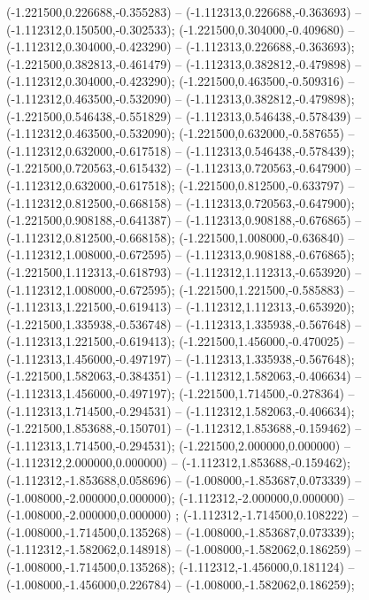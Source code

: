  (-1.221500,0.226688,-0.355283) -- (-1.112313,0.226688,-0.363693) -- (-1.112312,0.150500,-0.302533);
 (-1.221500,0.304000,-0.409680) -- (-1.112312,0.304000,-0.423290) -- (-1.112313,0.226688,-0.363693);
 (-1.221500,0.382813,-0.461479) -- (-1.112313,0.382812,-0.479898) -- (-1.112312,0.304000,-0.423290);
 (-1.221500,0.463500,-0.509316) -- (-1.112312,0.463500,-0.532090) -- (-1.112313,0.382812,-0.479898);
 (-1.221500,0.546438,-0.551829) -- (-1.112313,0.546438,-0.578439) -- (-1.112312,0.463500,-0.532090);
 (-1.221500,0.632000,-0.587655) -- (-1.112312,0.632000,-0.617518) -- (-1.112313,0.546438,-0.578439);
 (-1.221500,0.720563,-0.615432) -- (-1.112313,0.720563,-0.647900) -- (-1.112312,0.632000,-0.617518);
 (-1.221500,0.812500,-0.633797) -- (-1.112312,0.812500,-0.668158) -- (-1.112313,0.720563,-0.647900);
 (-1.221500,0.908188,-0.641387) -- (-1.112313,0.908188,-0.676865) -- (-1.112312,0.812500,-0.668158);
 (-1.221500,1.008000,-0.636840) -- (-1.112312,1.008000,-0.672595) -- (-1.112313,0.908188,-0.676865);
 (-1.221500,1.112313,-0.618793) -- (-1.112312,1.112313,-0.653920) -- (-1.112312,1.008000,-0.672595);
 (-1.221500,1.221500,-0.585883) -- (-1.112313,1.221500,-0.619413) -- (-1.112312,1.112313,-0.653920);
 (-1.221500,1.335938,-0.536748) -- (-1.112313,1.335938,-0.567648) -- (-1.112313,1.221500,-0.619413);
 (-1.221500,1.456000,-0.470025) -- (-1.112313,1.456000,-0.497197) -- (-1.112313,1.335938,-0.567648);
 (-1.221500,1.582063,-0.384351) -- (-1.112312,1.582063,-0.406634) -- (-1.112313,1.456000,-0.497197);
 (-1.221500,1.714500,-0.278364) -- (-1.112313,1.714500,-0.294531) -- (-1.112312,1.582063,-0.406634);
 (-1.221500,1.853688,-0.150701) -- (-1.112312,1.853688,-0.159462) -- (-1.112313,1.714500,-0.294531);
 (-1.221500,2.000000,0.000000) -- (-1.112312,2.000000,0.000000) -- (-1.112312,1.853688,-0.159462);
 (-1.112312,-1.853688,0.058696) -- (-1.008000,-1.853687,0.073339) -- (-1.008000,-2.000000,0.000000);
 (-1.112312,-2.000000,0.000000) -- (-1.008000,-2.000000,0.000000) ;
 (-1.112312,-1.714500,0.108222) -- (-1.008000,-1.714500,0.135268) -- (-1.008000,-1.853687,0.073339);
 (-1.112312,-1.582062,0.148918) -- (-1.008000,-1.582062,0.186259) -- (-1.008000,-1.714500,0.135268);
 (-1.112312,-1.456000,0.181124) -- (-1.008000,-1.456000,0.226784) -- (-1.008000,-1.582062,0.186259);
